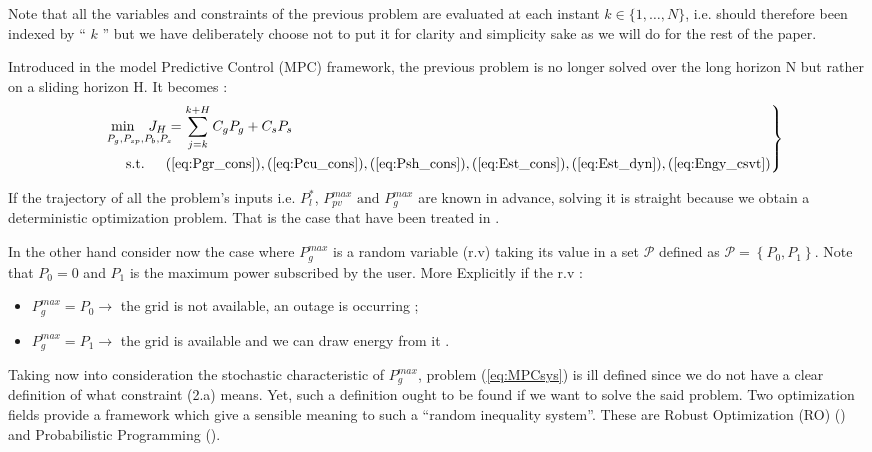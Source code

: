 \documentclass{ifacconf}
\begin{document}
Note that all the variables and constraints of the previous problem are evaluated at each instant $k \in \{1, \ldots, N \}$, i.e. should therefore been indexed by `` $k$ '' but we have deliberately choose not to  put it for clarity and simplicity sake as we will do for the rest of the paper.

Introduced in the model Predictive Control (MPC) framework, the previous problem is no longer solved over the long horizon N but rather on a sliding horizon H. It becomes : 
\begin{equation}\label{eq:MPCsys}
\left. 
\begin{aligned}
&\underset{P_g,P_{sp},P_b,P_s}{\hspace{10px} \text{min} \hspace{10px}J_H =} \sum_{j=k}^{k+H} C_gP_g + C_sP_s\\
& \text{\hspace{20px} s.t.\hspace{15px}} (\ref{eq:Pgr_cons}),(\ref{eq:Pcu_cons}),(\ref{eq:Psh_cons}), (\ref{eq:Est_cons}), (\ref{eq:Est_dyn}),(\ref{eq:Engy_csvt})
\end{aligned}\right \}
\end{equation}

If the trajectory of all the problem's inputs i.e. $P_l^*$, $P_{pv}^{max}  \text{ and } P_g^{max}$ are known in advance, solving it is straight because we obtain a deterministic optimization problem. 
That is the case that have been treated in \cite{JPrPHa2019}.

In the other hand consider now the case where $P_g^{max}$ is a random variable (r.v) taking its value in a set $\mathcal{P}$ defined as $ \mathcal{P} = \left \{ P_0 , P_1\right \}$. Note that $P_0=0$ and $P_1$ is the maximum power subscribed by the user. More Explicitly if the r.v : \begin{itemize}
\item $P_g^{max} = P_0 \rightarrow$ the grid is not available, an outage is occurring ; 
\item $P_g^{max} = P_1 \rightarrow$ the grid is available and we can draw energy from it . 
\end{itemize}

Taking now into consideration the stochastic characteristic of $P_g^{max}$, problem (\ref{eq:MPCsys}) is ill defined since we do not have a clear definition of what constraint (2.a) means. Yet, such a definition ought to be found if we want to solve the said problem. Two optimization fields  provide a framework which give a sensible meaning to such a ``random inequality system”. These are Robust Optimization (RO) (\cite{BenTal2009}) and Probabilistic Programming (\cite{Ankopa1995}).
\end{document}
